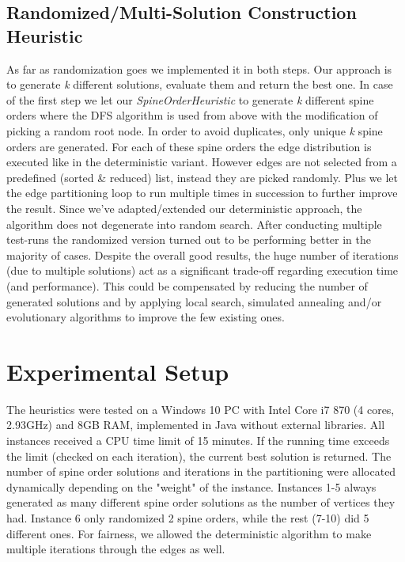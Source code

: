 \documentclass[11pt]{article}
\begin{document}
\subsection{Randomized/Multi-Solution Construction Heuristic}
\hspace{0.5cm} As far as randomization goes we implemented it in both steps. Our approach is to generate \textit{k} different solutions, evaluate them and return the best one. In case of the first step we let our \textit{SpineOrderHeuristic} to generate \textit{k} different spine orders where the DFS algorithm is used from above with the modification of picking a random root node. In order to avoid duplicates, only unique \textit{k} spine orders are generated. For each of these spine orders the edge distribution is executed like in the deterministic variant. However edges are not selected from a predefined (sorted \& reduced) list, instead they are picked randomly. Plus we let the edge partitioning loop to run multiple times in succession to further improve the result. Since we've adapted/extended our deterministic approach, the algorithm does not degenerate into random search. After conducting multiple test-runs the randomized version turned out to be performing better in the majority of cases. Despite the overall good results, the huge number of iterations (due to multiple solutions) act as a significant trade-off regarding execution time (and performance). This could be compensated by reducing the number of generated solutions and by applying local search, simulated annealing and/or evolutionary algorithms to improve the few existing ones.

\section{Experimental Setup}
\hspace{0.5cm} The heuristics were tested on a Windows 10 PC with Intel Core i7 870 (4 cores, 2.93GHz) and 8GB RAM, implemented in Java without external libraries. All instances received a CPU time limit of 15 minutes. If the running time exceeds the limit (checked on each iteration), the current best solution is returned. The number of spine order solutions and iterations in the partitioning were allocated dynamically depending on the "weight" of the instance. Instances 1-5 always generated as many different spine order solutions as the number of vertices they had. Instance 6 only randomized 2 spine orders, while the rest (7-10) did 5 different ones. For fairness, we allowed the deterministic algorithm to make multiple iterations through the edges as well.
\newpage
\end{document}
